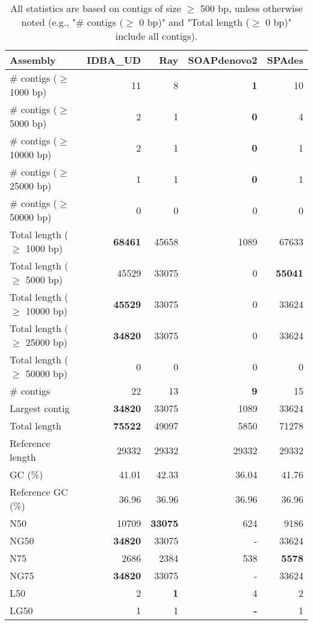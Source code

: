 \documentclass[12pt,a4paper]{article}
\begin{document}
\begin{table}[ht]
\begin{center}
\caption{All statistics are based on contigs of size $\geq$ 500 bp, unless otherwise noted (e.g., "\# contigs ($\geq$ 0 bp)" and "Total length ($\geq$ 0 bp)" include all contigs).}
\begin{tabular}{|l*{4}{|r}|}
\hline
Assembly & IDBA\_UD & Ray & SOAPdenovo2 & SPAdes \\ \hline
\# contigs ($\geq$ 1000 bp) & 11 & 8 & {\bf 1} & 10 \\ \hline
\# contigs ($\geq$ 5000 bp) & 2 & 1 & {\bf 0} & 4 \\ \hline
\# contigs ($\geq$ 10000 bp) & 2 & 1 & {\bf 0} & 1 \\ \hline
\# contigs ($\geq$ 25000 bp) & 1 & 1 & {\bf 0} & 1 \\ \hline
\# contigs ($\geq$ 50000 bp) & 0 & 0 & 0 & 0 \\ \hline
Total length ($\geq$ 1000 bp) & {\bf 68461} & 45658 & 1089 & 67633 \\ \hline
Total length ($\geq$ 5000 bp) & 45529 & 33075 & 0 & {\bf 55041} \\ \hline
Total length ($\geq$ 10000 bp) & {\bf 45529} & 33075 & 0 & 33624 \\ \hline
Total length ($\geq$ 25000 bp) & {\bf 34820} & 33075 & 0 & 33624 \\ \hline
Total length ($\geq$ 50000 bp) & 0 & 0 & 0 & 0 \\ \hline
\# contigs & 22 & 13 & {\bf 9} & 15 \\ \hline
Largest contig & {\bf 34820} & 33075 & 1089 & 33624 \\ \hline
Total length & {\bf 75522} & 49097 & 5850 & 71278 \\ \hline
Reference length & 29332 & 29332 & 29332 & 29332 \\ \hline
GC (\%) & 41.01 & 42.33 & 36.04 & 41.76 \\ \hline
Reference GC (\%) & 36.96 & 36.96 & 36.96 & 36.96 \\ \hline
N50 & 10709 & {\bf 33075} & 624 & 9186 \\ \hline
NG50 & {\bf 34820} & 33075 & - & 33624 \\ \hline
N75 & 2686 & 2384 & 538 & {\bf 5578} \\ \hline
NG75 & {\bf 34820} & 33075 & - & 33624 \\ \hline
L50 & 2 & {\bf 1} & 4 & 2 \\ \hline
LG50 & 1 & 1 & {\bf -} & 1 \\ \hline

\end{tabular}
\end{center}
\end{table}
\end{document}

